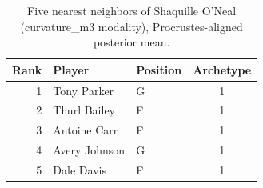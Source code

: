 \begin{table}[htbp]
  \centering\small
  \begin{tabular}{rllc}
    \toprule
    Rank & Player & Position & Archetype \\
    \midrule
    1 & Tony Parker & G & 1 \\
    2 & Thurl Bailey & F & 1 \\
    3 & Antoine Carr & F & 1 \\
    4 & Avery Johnson & G & 1 \\
    5 & Dale Davis & F & 1 \\
    \bottomrule
  \end{tabular}
  \caption{Five nearest neighbors of Shaquille O'Neal (curvature_m3 modality), Procrustes-aligned posterior mean.}
  \label{tab:Shaquille_O_Neal_neighbors_curvature_m3}
\end{table}

